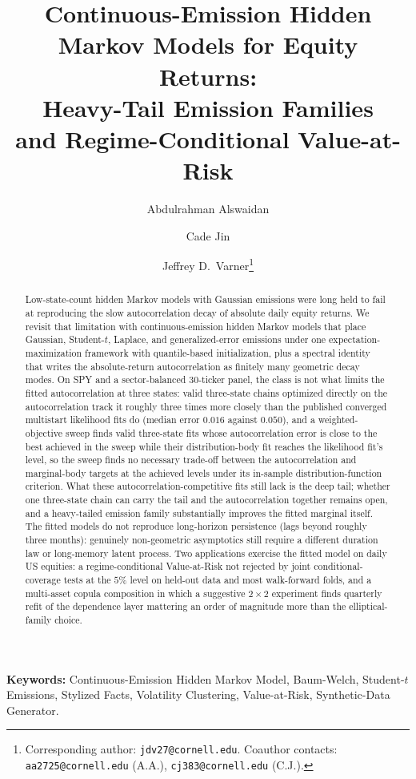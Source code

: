 \documentclass[11pt]{article}
\title{Continuous-Emission Hidden Markov Models for Equity Returns:\\ Heavy-Tail Emission Families\\ and Regime-Conditional Value-at-Risk}
\author[1]{Abdulrahman Alswaidan}
\author[2]{Cade Jin}
\author[1]{Jeffrey D.~Varner\thanks{\raggedright Corresponding author: \texttt{jdv27@cornell.edu}. Coauthor contacts: \texttt{aa2725@cornell.edu} (A.A.), \texttt{cj383@cornell.edu} (C.J.).\par}}
\affil[1]{Robert Frederick Smith School of Chemical and Biomolecular Engineering, Cornell University, Ithaca, NY 14850, USA}
\affil[2]{Cornell Ann S.~Bowers College of Computing and Information Science, Cornell University, Ithaca, NY 14850, USA}
\date{}
\begin{document}
\maketitle

\begin{abstract}
Low-state-count hidden Markov models with Gaussian emissions were long held to fail at reproducing the slow autocorrelation decay of absolute daily equity returns. We revisit that limitation with continuous-emission hidden Markov models that place Gaussian, Student-$t$, Laplace, and generalized-error emissions under one expectation-maximization framework with quantile-based initialization, plus a spectral identity that writes the absolute-return autocorrelation as finitely many geometric decay modes. On SPY and a sector-balanced 30-ticker panel, the class is not what limits the fitted autocorrelation at three states: valid three-state chains optimized directly on the autocorrelation track it roughly three times more closely than the published converged multistart likelihood fits do (median error $0.016$ against $0.050$), and a weighted-objective sweep finds valid three-state fits whose autocorrelation error is close to the best achieved in the sweep while their distribution-body fit reaches the likelihood fit's level, so the sweep finds no necessary trade-off between the autocorrelation and marginal-body targets at the achieved levels under its in-sample distribution-function criterion. What these autocorrelation-competitive fits still lack is the deep tail; whether one three-state chain can carry the tail and the autocorrelation together remains open, and a heavy-tailed emission family substantially improves the fitted marginal itself. The fitted models do not reproduce long-horizon persistence (lags beyond roughly three months): genuinely non-geometric asymptotics still require a different duration law or long-memory latent process. Two applications exercise the fitted model on daily US equities: a regime-conditional Value-at-Risk not rejected by joint conditional-coverage tests at the $5\%$ level on held-out data and most walk-forward folds, and a multi-asset copula composition in which a suggestive $2 \times 2$ experiment finds quarterly refit of the dependence layer mattering an order of magnitude more than the elliptical-family choice.
\end{abstract}

\noindent\textbf{Keywords:} Continuous-Emission Hidden Markov Model, Baum-Welch, Student-$t$ Emissions, Stylized Facts, Volatility Clustering, Value-at-Risk, Synthetic-Data Generator.
\end{document}
